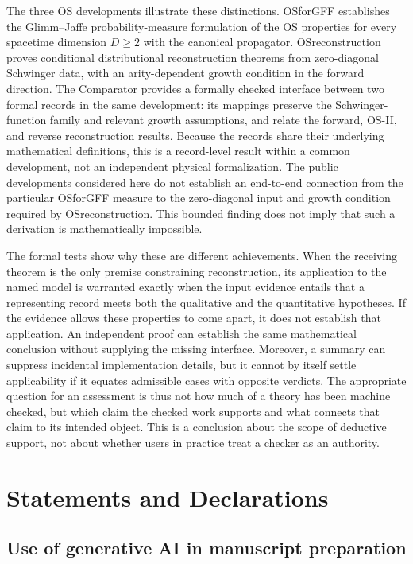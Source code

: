 \documentclass[pdflatex,sn-apa]{sn-jnl}
\begin{document}
The three OS developments illustrate these distinctions. OSforGFF establishes the Glimm--Jaffe probability-measure formulation of the OS properties for every spacetime dimension \(D\geq2\) with the canonical propagator. OSreconstruction proves conditional distributional reconstruction theorems from zero-diagonal Schwinger data, with an arity-dependent growth condition in the forward direction. The Comparator provides a formally checked interface between two formal records in the same development: its mappings preserve the Schwinger-function family and relevant growth assumptions, and relate the forward, OS-II, and reverse reconstruction results. Because the records share their underlying mathematical definitions, this is a record-level result within a common development, not an independent physical formalization. The public developments considered here do not establish an end-to-end connection from the particular OSforGFF measure to the zero-diagonal input and growth condition required by OSreconstruction. This bounded finding does not imply that such a derivation is mathematically impossible.

The formal tests show why these are different achievements. When the receiving theorem is the only premise constraining reconstruction, its application to the named model is warranted exactly when the input evidence entails that a representing record meets both the qualitative and the quantitative hypotheses. If the evidence allows these properties to come apart, it does not establish that application. An independent proof can establish the same mathematical conclusion without supplying the missing interface. Moreover, a summary can suppress incidental implementation details, but it cannot by itself settle applicability if it equates admissible cases with opposite verdicts. The appropriate question for an assessment is thus not how much of a theory has been machine checked, but which claim the checked work supports and what connects that claim to its intended object. This is a conclusion about the scope of deductive support, not about whether users in practice treat a checker as an authority.

\section*{Statements and Declarations}

\subsection*{Use of generative AI in manuscript preparation}
\end{document}
